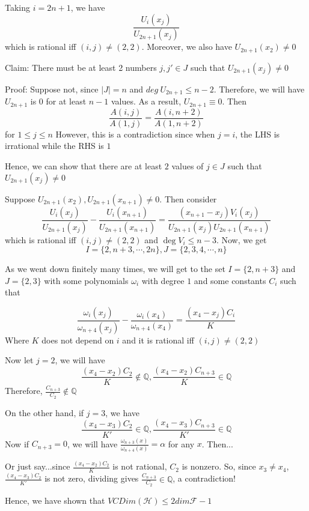 \documentclass[english, 10pt]{article} %
\begin{document}
Taking $i=2n+1$, we have
$$\frac{U_i(x_j)}{U_{2n+1}(x_j)}$$
which is rational iff $(i,j) \neq (2,2)$. Moreover, we also have $U_{2n+1}(x_2) \neq 0$


Claim: There must be at least 2 numbers $j,j' \in J$ such that $U_{2n+1}(x_j) \neq 0$


Proof: Suppose not, since $|J| = n$ and $deg \ U_{2n+1} \leq n-2$. Therefore, we will have $U_{2n+1}$ is $0$ for at least $n-1$ values. As a result, $U_{2n+1} \equiv 0$. Then
$$\frac{A(i,j)}{A(1,j)} = \frac{A(i,n+2)}{A(1,n+2)}$$
for $1 \leq j \leq n$ However, this is a contradiction since when $j=i$, the LHS is irrational while the RHS is $1$

Hence, we can show that there are at least $2$ values of $j \in J$ such that $U_{2n+1}(x_j) \neq 0$

Suppose $U_{2n+1}(x_2),U_{2n+1}(x_{n+1}) \neq 0$. Then consider
$$\frac{U_i(x_j)}{U_{2n+1}(x_j)}-\frac{U_i(x_{n+1})}{U_{2n+1}(x_{n+1})} = \frac{(x_{n+1}-x_j)V_i(x_j)}{U_{2n+1}(x_j)U_{2n+1}(x_{n+1})}$$
which is rational iff $(i,j) \neq (2,2)$ and $\deg V_i \leq n-3$. Now, we get
$$I=\{2,n+3,\cdots,2n \}, J = \{2,3,4,\cdots,n\}$$

As we went down finitely many times, we will get to the set $I=\{2,n+3 \}$ and $J=\{2,3\}$ with some polynomials $\omega_i$ with degree $1$ and some constants $C_i$ such that


$$\frac{\omega_i(x_j)}{\omega_{n+4}(x_j)}-\frac{\omega_i(x_{4})}{\omega_{n+4}(x_4)} = \frac{(x_4-x_j)C_i}{K}$$
Where $K$ does not depend on $i$ and it is rational iff $(i,j) \neq (2,2)$

Now let $j=2$, we will have
$$\frac{(x_4-x_2)C_2}{K} \not \in \mathbb{Q}, \frac{(x_4-x_2)C_{n+3}}{K} \in \mathbb{Q}$$
Therefore, $\frac{C_{n+3}}{C_2} \not \in \mathbb{Q}$

On the other hand, if $j=3$, we have
$$\frac{(x_4-x_3)C_2}{K'} \in \mathbb{Q}, \frac{(x_4-x_3)C_{n+3}}{K'} \in \mathbb{Q}$$
Now if $C_{n+3}=0$, we will have $\frac{\omega_{n+3}(x)}{\omega_{n+4}(x)}=\alpha$ for any $x$. Then...

Or just say...since $\frac{(x_4-x_2)C_2}{K}$ is not rational, $C_2$ is nonzero. So, since $x_3 \neq x_4$, $\frac{(x_4-x_3)C_2}{K'}$ is not zero, dividing gives $\frac{C_{n+3}}{C_2} \in \mathbb{Q}$, a contradiction!

Hence, we have shown that $VCDim(\mathcal{H}) \leq 2dim \mathcal{F}-1$
\end{document}
